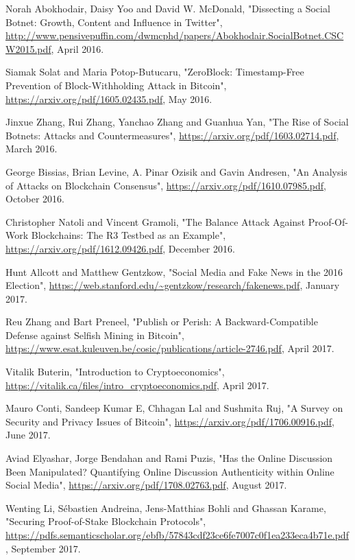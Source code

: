 \documentclass[12pt,a4paper]{article}
\begin{document}
\begin{thebibliography}{9}
Norah Abokhodair, Daisy Yoo and David W. McDonald,
"Dissecting a Social Botnet: Growth, Content and Influence in Twitter",
\url{http://www.pensivepuffin.com/dwmcphd/papers/Abokhodair.SocialBotnet.CSCW2015.pdf},
April 2016.

Siamak Solat and Maria Potop-Butucaru,
"ZeroBlock: Timestamp-Free Prevention of Block-Withholding Attack in Bitcoin",
\url{https://arxiv.org/pdf/1605.02435.pdf},
May 2016.

Jinxue Zhang, Rui Zhang, Yanchao Zhang and Guanhua Yan,
"The Rise of Social Botnets: Attacks and Countermeasures",
\url{https://arxiv.org/pdf/1603.02714.pdf},
March 2016.

George Bissias, Brian Levine, A. Pinar Ozisik and Gavin Andresen,
"An Analysis of Attacks on Blockchain Consensus",
\url{https://arxiv.org/pdf/1610.07985.pdf},
October 2016.

Christopher Natoli and Vincent Gramoli,
"The Balance Attack Against Proof-Of-Work Blockchains: The R3 Testbed as an Example",
\url{https://arxiv.org/pdf/1612.09426.pdf},
December 2016.

Hunt Allcott and Matthew Gentzkow,
"Social Media and Fake News in the 2016 Election",
\url{https://web.stanford.edu/~gentzkow/research/fakenews.pdf},
January 2017.

Reu Zhang and Bart Preneel,
"Publish or Perish: A Backward-Compatible Defense against Selfish Mining in Bitcoin",
\url{https://www.esat.kuleuven.be/cosic/publications/article-2746.pdf},
April 2017.

Vitalik Buterin,
"Introduction to Cryptoeconomics",
\url{https://vitalik.ca/files/intro_cryptoeconomics.pdf},
April 2017.

Mauro Conti, Sandeep Kumar E, Chhagan Lal and Sushmita Ruj,
"A Survey on Security and Privacy Issues of Bitcoin",
\url{https://arxiv.org/pdf/1706.00916.pdf},
June 2017.

Aviad Elyashar, Jorge Bendahan and Rami Puzis,
"Has the Online Discussion Been Manipulated? Quantifying Online Discussion Authenticity within Online Social Media",
\url{https://arxiv.org/pdf/1708.02763.pdf},
August 2017.

Wenting Li, Sébastien Andreina, Jens-Matthias Bohli and Ghassan Karame,
"Securing Proof-of-Stake Blockchain Protocols",
\url{https://pdfs.semanticscholar.org/ebfb/57843cdf23ce6fe7007c0f1ea233eca4b71e.pdf},
September 2017.


\end{thebibliography}
\end{document}
